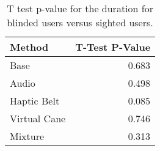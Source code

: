 
\begin{table}[!htb]
\centering
\caption{T test p-value for the duration for blinded users versus sighted users.}
\label{tab:ttest_duration}
\begin{tabular}{lr}
\toprule
      Method &  T-Test P-Value \\
\midrule
        Base &           0.683 \\
       Audio &           0.498 \\
 Haptic Belt &           0.085 \\
Virtual Cane &           0.746 \\
     Mixture &           0.313 \\
\bottomrule
\end{tabular}
\end{table}

